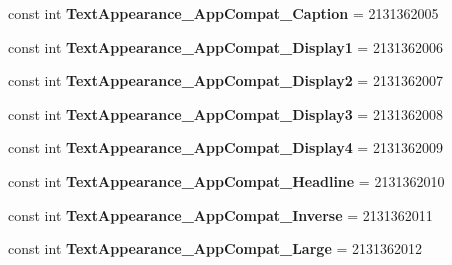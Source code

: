\begin{DoxyCompactItemize}
const int {\bfseries Text\+Appearance\+\_\+\+App\+Compat\+\_\+\+Caption} = 2131362005
\item 
\mbox{\label{class_sample_app_1_1_droid_1_1_resource_1_1_style_a61238458a9725715dc4b9a03e1309747}} 
const int {\bfseries Text\+Appearance\+\_\+\+App\+Compat\+\_\+\+Display1} = 2131362006
\item 
\mbox{\label{class_sample_app_1_1_droid_1_1_resource_1_1_style_a018b9e2ff742e3423c85e021b23d08a5}} 
const int {\bfseries Text\+Appearance\+\_\+\+App\+Compat\+\_\+\+Display2} = 2131362007
\item 
\mbox{\label{class_sample_app_1_1_droid_1_1_resource_1_1_style_a55ca8cbea38b08c6958e32c4b0d23656}} 
const int {\bfseries Text\+Appearance\+\_\+\+App\+Compat\+\_\+\+Display3} = 2131362008
\item 
\mbox{\label{class_sample_app_1_1_droid_1_1_resource_1_1_style_adf28fbb8f602b934faea061604623a0b}} 
const int {\bfseries Text\+Appearance\+\_\+\+App\+Compat\+\_\+\+Display4} = 2131362009
\item 
\mbox{\label{class_sample_app_1_1_droid_1_1_resource_1_1_style_a7062da64b0353a5bd1c699c1e07f2384}} 
const int {\bfseries Text\+Appearance\+\_\+\+App\+Compat\+\_\+\+Headline} = 2131362010
\item 
\mbox{\label{class_sample_app_1_1_droid_1_1_resource_1_1_style_a24b094470fea641b36ac2fdb37654ddc}} 
const int {\bfseries Text\+Appearance\+\_\+\+App\+Compat\+\_\+\+Inverse} = 2131362011
\item 
\mbox{\label{class_sample_app_1_1_droid_1_1_resource_1_1_style_a093bbe4ec736074644efd8e0c1141eb7}} 
const int {\bfseries Text\+Appearance\+\_\+\+App\+Compat\+\_\+\+Large} = 2131362012
\item 
\mbox{\label{class_sample_app_1_1_droid_1_1_resource_1_1_style_a2386ddbc744de6e6bee21488847f163a}} 

\end{DoxyCompactItemize}
